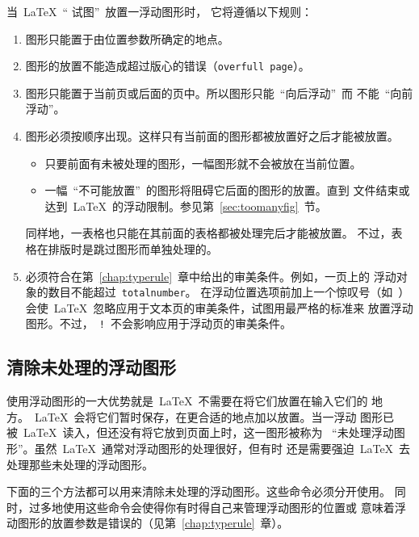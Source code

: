 当~\LaTeX{}~``{ 试图}''~放置一浮动图形时，
它将遵循以下规则：
\begin{enumerate}
	\item 图形只能置于由位置参数所确定的地点。
	\item 图形的放置不能造成超过版心的错误（\texttt{overfull page}）。
	\item 图形只能置于当前页或后面的页中。所以图形只能~``向后浮动''~而
	不能~``向前浮动''。
	\item 图形必须按顺序出现。这样只有当前面的图形都被放置好之后才能被放置。
	\begin{itemize}
		\item 只要前面有未被处理的图形，一幅图形就不会被放在当前位置。
		\item 一幅~``不可能放置''~的图形将阻碍它后面的图形的放置。直到
		文件结束或达到~\LaTeX{}~的浮动限制。参见第~\ref{sec:toomanyfig}~节。
	\end{itemize}
	同样地，一表格也只能在其前面的表格都被处理完后才能被放置。
	不过，表格在排版时是跳过图形而单独处理的。
	\item 必须符合在第~\ref{chap:typerule}~章中给出的审美条件。例如，一页上的
	浮动对象的数目不能超过~\texttt{totalnumber}。
	在浮动位置选项前加上一个惊叹号（如~）
	会使~\LaTeX{}~忽略应用于文本页的审美条件，试图用最严格的标准来
	放置浮动图形。不过，~\texttt{!}~不会影响应用于浮动页的审美条件。
\end{enumerate}

\subsection{清除未处理的浮动图形}\label{ssec:unprocessfig}

使用浮动图形的一大优势就是~\LaTeX{}~不需要在将它们放置在输入它们的
地方。~\LaTeX{}~会将它们暂时保存，在更合适的地点加以放置。当一浮动
图形已被~\LaTeX{}~读入，但还没有将它放到页面上时，这一图形被称为
~``未处理浮动图形''。虽然~\LaTeX{}~通常对浮动图形的处理很好，但有时
还是需要强迫~\LaTeX{}~去处理那些未处理的浮动图形。

下面的三个方法都可以用来清除未处理的浮动图形。这些命令必须分开使用。
同时，过多地使用这些命令会使得你有时得自己来管理浮动图形的位置或
意味着浮动图形的放置参数是错误的（见第~\ref{chap:typerule}~章）。

